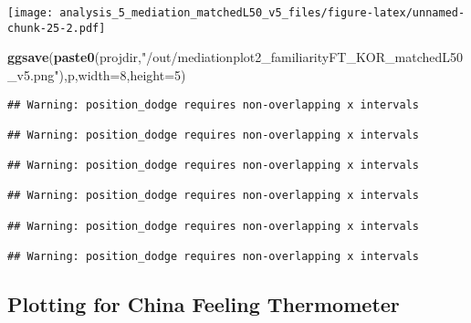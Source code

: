 \documentclass[
]{article}
\newenvironment{Shaded}{\begin{snugshade}}{\end{snugshade}}
\newcommand{\DataTypeTok}[1]{\textcolor[rgb]{0.13,0.29,0.53}{#1}}
\newcommand{\DecValTok}[1]{\textcolor[rgb]{0.00,0.00,0.81}{#1}}
\newcommand{\KeywordTok}[1]{\textcolor[rgb]{0.13,0.29,0.53}{\textbf{#1}}}
\newcommand{\NormalTok}[1]{#1}
\newcommand{\StringTok}[1]{\textcolor[rgb]{0.31,0.60,0.02}{#1}}
\begin{document}
\texttt{[image: analysis\_5\_mediation\_matchedL50\_v5\_files/figure-latex/unnamed-chunk-25-2.pdf]}

\begin{Shaded}
\begin{Highlighting}[]
\KeywordTok{ggsave}\NormalTok{(}\KeywordTok{paste0}\NormalTok{(projdir,}\StringTok{"/out/mediationplot2_familiarityFT_KOR_matchedL50_v5.png"}\NormalTok{),p,}\DataTypeTok{width=}\DecValTok{8}\NormalTok{,}\DataTypeTok{height=}\DecValTok{5}\NormalTok{)}
\end{Highlighting}
\end{Shaded}

\begin{verbatim}
## Warning: position_dodge requires non-overlapping x intervals

## Warning: position_dodge requires non-overlapping x intervals

## Warning: position_dodge requires non-overlapping x intervals

## Warning: position_dodge requires non-overlapping x intervals

## Warning: position_dodge requires non-overlapping x intervals

## Warning: position_dodge requires non-overlapping x intervals
\end{verbatim}

\hypertarget{plotting-for-china-feeling-thermometer}{%
\subsection{Plotting for China Feeling
Thermometer}\label{plotting-for-china-feeling-thermometer}}
\end{document}
